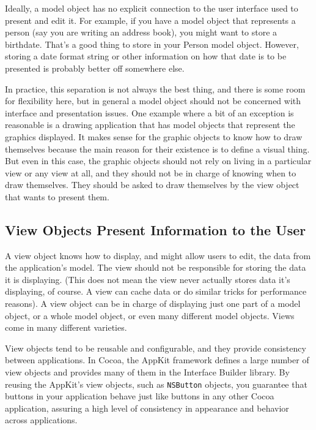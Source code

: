 Ideally, a model object has no explicit connection to the user interface used to
present and edit it. For example, if you have a model object that represents a
person (say you are writing an address book), you might want to store a
birthdate. That’s a good thing to store in your Person model object. However,
storing a date format string or other information on how that date is to be
presented is probably better off somewhere else.

In practice, this separation is not always the best thing, and there is some
room for flexibility here, but in general a model object should not be concerned
with interface and presentation issues. One example where a bit of an exception
is reasonable is a drawing application that has model objects that represent the
graphics displayed. It makes sense for the graphic objects to know how to draw
themselves because the main reason for their existence is to define a visual
thing. But even in this case, the graphic objects should not rely on living in a
particular view or any view at all, and they should not be in charge of knowing
when to draw themselves. They should be asked to draw themselves by the view
object that wants to present them.

\subsection{View Objects Present Information to the User}

A view object knows how to display, and might allow users to edit, the data from
the application’s model. The view should not be responsible for storing the data
it is displaying. (This does not mean the view never actually stores data it’s
displaying, of course. A view can cache data or do similar tricks for
performance reasons). A view object can be in charge of displaying just one part
of a model object, or a whole model object, or even many different model
objects. Views come in many different varieties.

View objects tend to be reusable and configurable, and they provide consistency
between applications. In Cocoa, the AppKit framework defines a large number of
view objects and provides many of them in the Interface Builder library. By
reusing the AppKit’s view objects, such as \texttt{NSButton} objects, you
guarantee that buttons in your application behave just like buttons in any other
Cocoa application, assuring a high level of consistency in appearance and
behavior across applications.

